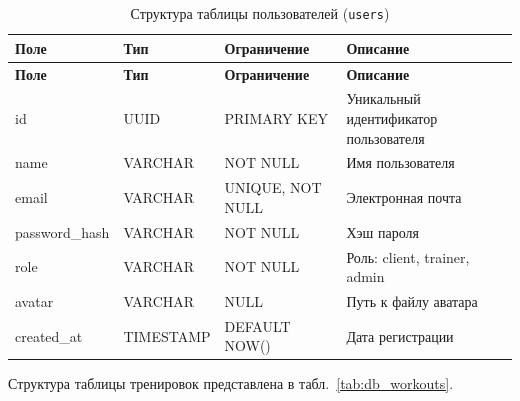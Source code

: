 \begin{longtable}{|l|l|p{3.5cm}|p{5.5cm}|}
    \caption{Структура таблицы пользователей (\texttt{users})} \label{tab:db_users} \\

    \hline
    \textbf{Поле} & \textbf{Тип} & \textbf{Ограничение} & \textbf{Описание} \\ \hline
    \endfirsthead

    \tabcont{\ref{tab:db_users}}
    \textbf{Поле} & \textbf{Тип} & \textbf{Ограничение} & \textbf{Описание} \\ \hline
    \endhead

    \hline
    \endfoot

    \hline
    \endlastfoot

    id             & UUID      & PRIMARY KEY      & Уникальный идентификатор пользователя \\ \hline
    name           & VARCHAR   & NOT NULL         & Имя пользователя                      \\ \hline
    email          & VARCHAR   & UNIQUE, NOT NULL & Электронная почта                     \\ \hline
    password\_hash & VARCHAR   & NOT NULL         & Хэш пароля                            \\ \hline
    role           & VARCHAR   & NOT NULL         & Роль: client, trainer, admin          \\ \hline
    avatar         & VARCHAR   & NULL             & Путь к файлу аватара                  \\ \hline
    created\_at    & TIMESTAMP & DEFAULT NOW()    & Дата регистрации                      \\ \hline
\end{longtable}

Структура таблицы тренировок представлена в табл.~\ref{tab:db_workouts}.

